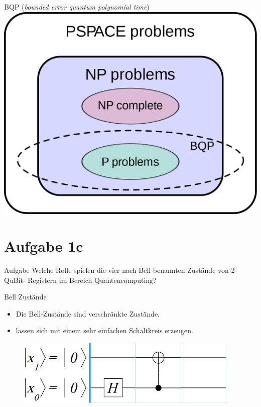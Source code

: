 \documentclass[fleqn,compress,utf8,aspectratio=169,t]{beamer}
\begin{document}
\begin{frame}{BQP (\textit{bounded error quantum polynomial time})}
\centering
\includegraphics[height=.8\textheight]{images/1280px-BQP_complexity_class_diagram.svg.png}
\end{frame}

\section{Aufgabe 1c}

\begin{frame}{Aufgabe}
Welche Rolle spielen die vier nach Bell benannten Zustände von 2-QuBit-
Registern im Bereich Quantencomputing?
\end{frame}

\begin{frame}{Bell Zustände}
\begin{itemize}
	\item Die Bell-Zustände sind verschränkte Zustände.
	\item lassen sich mit einem sehr einfachen Schaltkreis erzeugen.
\end{itemize}
\begin{figure}
	\centering
	\includegraphics[height=.3\textheight]{images/1c.png}
\end{figure}
\end{frame}
\end{document}
